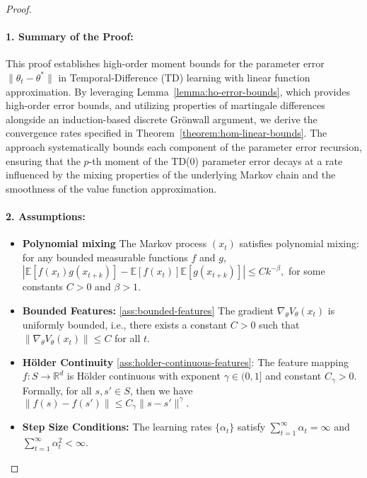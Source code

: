 \begin{proof}
\;\newline
\paragraph{1. Summary of the Proof:}  
This proof establishes high-order moment bounds for the parameter error \( \|\theta_t - \theta^*\| \) in Temporal-Difference (TD) learning with linear function approximation. By leveraging Lemma~\ref{lemma:ho-error-bounds}, which provides high-order error bounds, and utilizing properties of martingale differences alongside an induction-based discrete Grönwall argument, we derive the convergence rates specified in Theorem~\ref{theorem:hom-linear-bounds}. The approach systematically bounds each component of the parameter error recursion, ensuring that the \( p \)-th moment of the TD(0) parameter error decays at a rate influenced by the mixing properties of the underlying Markov chain and the smoothness of the value function approximation.

\paragraph{2. Assumptions:}
\begin{itemize}
    \item \textbf{Polynomial mixing} The Markov process \((x_t)\) satisfies polynomial mixing: for any bounded measurable functions \(f\) and \(g\),
\(
|\mathbb{E}[f(x_t)g(x_{t+k})] - \mathbb{E}[f(x_t)]\mathbb{E}[g(x_{t+k})]| \leq C k^{-\beta},
\)
for some constants \(C > 0\) and \(\beta > 1\).
    \item \textbf{Bounded Features:} \ref{ass:bounded-features} The gradient \( \nabla_\theta V_\theta(x_t) \) is uniformly bounded, i.e., there exists a constant \( C > 0 \) such that \( \|\nabla_\theta V_\theta(x_t)\| \leq C \) for all \( t \).
    \item \textbf{Hölder Continuity} \ref{ass:holder-continuous-features}: The feature mapping \( f: S \to \mathbb{R}^d \) is Hölder continuous with exponent \( \gamma \in (0, 1] \) and constant \( C_\gamma > 0 \). Formally, for all \( s, s' \in S \), then we have \(\|f(s) - f(s')\| \leq C_\gamma \|s - s'\|^\gamma.\)
    \item \textbf{Step Size Conditions:} The learning rates \( \{\alpha_t\} \) satisfy \( \sum_{t=1}^\infty \alpha_t = \infty \) and \( \sum_{t=1}^\infty \alpha_t^2 < \infty \). 
\end{itemize}

\end{proof}

